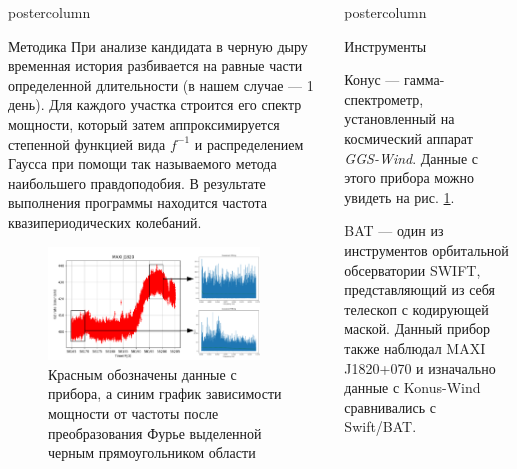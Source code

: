 \documentclass{beamer}
\newlength{\columnheight}
\begin{document}
\begin{frame}
\begin{columns}
\begin{column}{.43\textwidth}
\begin{beamercolorbox}[center]{postercolumn}
\begin{minipage}{.98\textwidth}
{\begin{myblock}{Методика}
						При анализе кандидата в черную дыру временная история разбивается на равные части определенной длительности (в нашем случае --- 1 день). Для каждого участка строится его спектр мощности, который затем аппроксимируется степенной функцией вида $f^{-1}$ и распределением Гаусса при помощи так называемого метода наибольшего правдоподобия. В результате выполнения программы находится частота квазипериодических колебаний.
						
						\begin{figure}
							\centering
							\includegraphics[width=0.9\textwidth]{example.png}
							\caption{Красным обозначены данные с прибора, а синим график зависимости мощности от частоты после преобразования Фурье выделенной черным прямоугольником области}
							\label{fig:graf}
						\end{figure}

						
					\end{myblock}\vfill
		}\end{minipage}\end{beamercolorbox}
	\end{column}
	\begin{column}{.57\textwidth}
		\begin{beamercolorbox}[center]{postercolumn}
			\begin{minipage}{.98\textwidth} %
				\parbox[t][\columnheight]{\textwidth}{ %
					\begin{myblock}{Инструменты}
						
						Конус --- гамма-спектрометр, установленный на космический аппарат \textit{GGS-Wind}. Данные с этого прибора можно увидеть на рис. \ref{fig:graf}.
						
						BAT --- один из инструментов орбитальной обсерватории SWIFT, представляющий из себя телескоп с кодирующей маской. Данный прибор также наблюдал MAXI J1820+070 и изначально данные с Konus-Wind сравнивались с Swift/BAT.
						

\end{myblock}}
\end{minipage}
\end{beamercolorbox}
\end{column}
\end{columns}
\end{frame}
\end{document}
